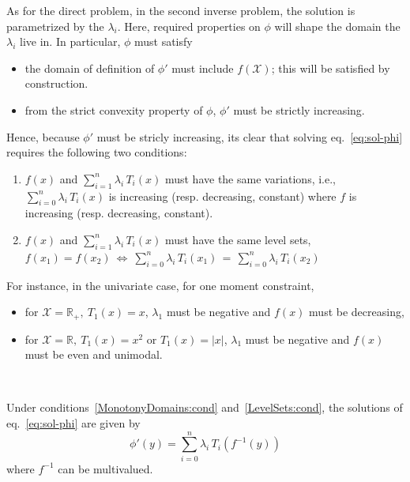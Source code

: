 \documentclass[entropy,article,submit,moreauthors,pdftex]{Definitions/mdpi}
\newcommand{\SZ}[1]{{\color{blue} #1}}
\def\Rset{\mathbb{R}}
\def\X{\mathcal{X}}
\begin{document}
As  for the  direct problem,  in  the second  inverse problem,  the solution  is
parametrized by the $\lambda_i$. Here,  required properties on $\phi$ will shape
the domain the $\lambda_i$ live in. In particular, $\phi$ must satisfy
%
\begin{itemize}
\item the  domain of definition  of $\phi'$ must  include $f(\X)$; this  will be
  satisfied by construction.
%
\item from  the strict convexity  property of  $\phi$, $\phi'$ must  be strictly
  increasing.
\end{itemize}
%
Hence,  because $\phi'$  must  be  stricly increasing,  its  clear that  solving
eq.~\eqref{eq:sol-phi} requires the following two conditions:
%
\begin{enumerate}[label=(C\arabic*)]
\item\label{MonotonyDomains:cond}   $f(x)$   and   $\displaystyle   \sum_{i=1}^n
  \lambda_i  \, T_i(x)$  must  have the  same  variations, i.e.,  $\displaystyle
  \sum_{i=0}^n  \lambda_i  \,  T_i(x)$  is  increasing  \SZ{(resp.   decreasing,
    constant)} where $f$ is increasing \SZ{(resp. decreasing, constant)}.
%
\item\label{LevelSets:cond} $f(x)$ and  $\displaystyle \sum_{i=1}^n \lambda_i \,
  T_i(x)$ must have the same level sets,\newline $ \displaystyle f(x_1) = f(x_2)
  \: \Leftrightarrow \: \sum_{i=0}^n \lambda_i  \, T_i(x_1) \, = \, \sum_{i=0}^n
  \lambda_i \, T_i(x_2)$
\end{enumerate}
%
For instance, in the univariate case, for one moment constraint,
%
\begin{itemize}
\item for $\X = \Rset_+, \: T_1(x) = x$, $\lambda_1$ must be negative and $f(x)$
  must be decreasing,
%
\item for $\X =  \Rset, \: T_1(x) = x^2$ or $T_1(x) =  |x|$, $\lambda_1$ must be
  negative and $f(x)$ must be even and unimodal.
\end{itemize}

\

Under   conditions~\ref{MonotonyDomains:cond}    and~\ref{LevelSets:cond},   the
solutions of eq.~\eqref{eq:sol-phi} are given by
%
\begin{equation}\label{eq:derivative-phi}
\phi'(y) = \sum_{i=0}^n \lambda_i \, T_i\!\left(f^{-1}(y)\right)
\end{equation}
%
where $f^{-1}$ can be multivalued.
\end{document}
